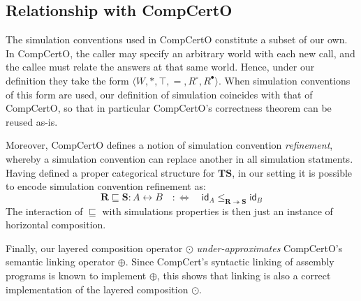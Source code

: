\documentclass[acmsmall,screen,review,anonymous]{acmart}
\newcommand{\kw}[1]{\ensuremath{ \mathsf{#1} }}
\newcommand{\que}{\circ}
\newcommand{\ans}{\bullet}
\begin{document}


\subsection{Relationship with CompCertO} %

The simulation conventions used in CompCertO
constitute a subset of our own.
In CompCertO,
the caller may specify an arbitrary world with each new call,
and the callee must relate the answers at that same world.
Hence,
under our definition they
take the form $\langle W, *, \top, {=}, R^\que, R^\ans \rangle$.
When simulation conventions of this form are used,
our definition of simulation coincides with that of CompCertO,
so that in particular
CompCertO's correctness theorem can be reused as-is.

Moreover,
CompCertO defines a notion of simulation convention \emph{refinement},
whereby a simulation convention
can replace another in all simulation statments.
Having defined a proper categorical structure for $\mathbf{TS}$,
in our setting
it is possible to encode simulation convention refinement as:
\[
  \mathbf{R} \sqsubseteq \mathbf{S} : A \leftrightarrow B
  \quad :\Leftrightarrow \quad
    \kw{id}_A \le_{\mathbf{R} \twoheadrightarrow \mathbf{S}} \kw{id}_B
\]
The interaction of $\sqsubseteq$ with simulations properties
is then just an instance of horizontal composition.

Finally,
our layered composition operator $\odot$
\emph{under-approximates}
CompCertO's semantic linking operator $\oplus$.
Since CompCert's syntactic linking of assembly programs
is known to implement $\oplus$,
this shows that linking is also a correct implementation of
the layered composition $\odot$.
\end{document}
